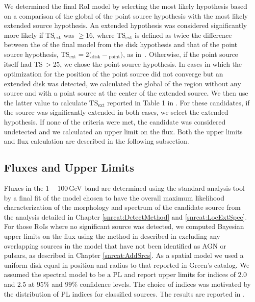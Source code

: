 
We determined the final RoI model by selecting the most likely hypothesis based on a comparison of the \gtlike{} global \logL{} of the point source hypothesis with the most likely extended source hypothesis. An extended hypothesis was considered significantly more likely if $\mathrm{TS_{ext}}$ was $\geq 16$, where $\mathrm{TS_{ext}}$ is defined as twice the difference between the \logL{} of the final model from the disk hypothesis and that of the point source hypothesis, $\mathrm{TS_{ext}} =  2 ($\logL{}$_{\mathrm{disk}}-$\logL{}$_{\mathrm{point}})$, as in~\citet{Lande12}. Otherwise, if the point source itself had TS\,$>25$, we chose the point source hypothesis. In cases in which the optimization for the position of the point source did not converge but an extended disk was detected, we calculated the global \logL{} of the region without any source and with a point source at the center of the extended source. We then use the latter value to calculate $\mathrm{TS_{ext}}$ reported in Table 1 in \cite{snrCat}. For these candidates, if the source was significantly extended in both cases, we select the extended hypothesis. If none of the criteria were met, the candidate was considered undetected and we calculated an upper limit on the flux. Both the upper limits and flux calculation are described in the following subsection.

\subsection{Fluxes and Upper Limits}\label{snrcat:FluxULs}

Fluxes in the $1-100$\,GeV band are determined using the standard analysis tool \gtlike{} by a final fit of the model chosen to have the overall maximum likelihood characterization of the morphology and spectrum of the candidate source from the analysis detailed in Chapter \ref{snrcat:DetectMethod} and \ref{snrcat:LocExtSpec}. For those RoIs where no significant source was detected, we computed Bayesian upper limits on the flux using the method in described in \citet{Helene83} excluding any overlapping sources in the model that have not been identified as AGN or pulsars, as described in Chapter \ref{snrcat:AddSrcs}. As a spatial model we used a uniform disk equal in position and radius to that reported in Green's catalog. We assumed the spectral model to be a PL and report upper limits for indices of $2.0$ and $2.5$ at $95\%$ and $99\%$ confidence levels. The choice of indices was motivated by the distribution of PL indices for classified sources. The results are reported in \cite{snrCat}.

